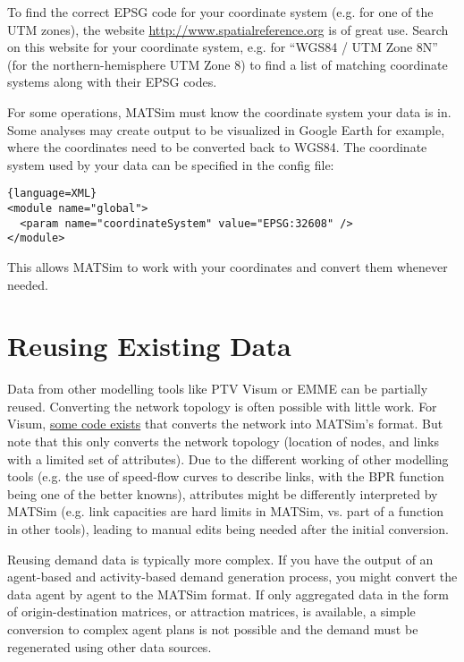 To find the correct EPSG code for your coordinate system (e.g. for one of the
UTM zones), the website \url{http://www.spatialreference.org} is of great use.
Search on this website for your coordinate system, e.g. for ``WGS84 / UTM Zone
8N'' (for the northern-hemisphere UTM Zone 8) to find a list of matching
coordinate systems along with their EPSG codes.


For some operations, MATSim must know the coordinate system your data is in.
Some analyses may create output to be visualized in Google Earth for example,
where the coordinates need to be converted back to WGS84. The coordinate system
used by your data can be specified in the config file:

\begin{lstlisting}{language=XML}
<module name="global">
  <param name="coordinateSystem" value="EPSG:32608" />
</module>
\end{lstlisting}

This allows MATSim to work with your coordinates and convert them whenever
needed.



\section{Reusing Existing Data}

Data from other modelling tools like PTV Visum or EMME can be partially reused.
Converting the network topology is often possible with little work. For Visum,
\href{http://matsim.org/javadoc/org/matsim/visum/package-summary.html}{some code
exists} that converts the network into MATSim's format. But note that this only
converts the network topology (location of nodes, and links with a limited set
of attributes). Due to the different working of other modelling tools (e.g. the 
use of speed-flow curves to describe links, with the BPR function being one of
the better knowns), attributes might be 
differently interpreted by MATSim (e.g. link capacities are hard limits in MATSim, 
vs. part of a function in other tools), leading to manual edits being needed 
after the initial conversion.

Reusing demand data is typically more complex. If you have the output of an 
agent-based and activity-based demand generation process, you might convert
the data agent by agent to the MATSim format. If only aggregated data
in the form of origin-destination matrices, or attraction matrices, is available,
a simple conversion to complex agent plans is not possible and the demand must be 
regenerated using other data sources.




